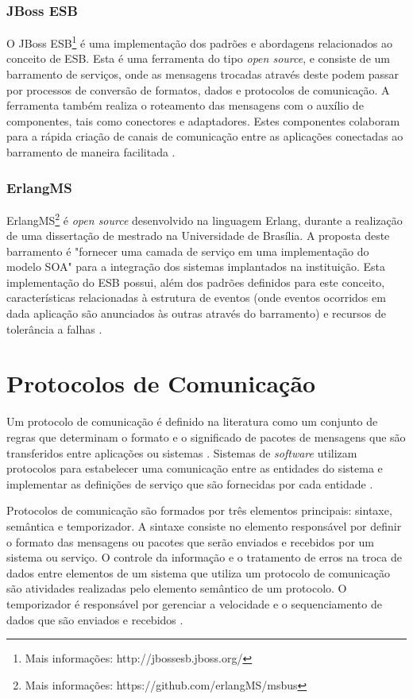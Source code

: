 \subsubsection{JBoss ESB}
O JBoss ESB\footnote{Mais informações: http://jbossesb.jboss.org/} é uma implementação dos padrões e abordagens relacionados ao conceito de ESB. Esta é uma ferramenta do tipo \textit{open source}, e consiste de um barramento de serviços, onde as mensagens trocadas através deste podem passar por processos de conversão de formatos, dados e protocolos de comunicação. A ferramenta também realiza o roteamento das mensagens com o auxílio de componentes, tais como conectores e adaptadores. Estes componentes colaboram para a rápida criação de canais de comunicação entre as aplicações conectadas ao barramento de maneira facilitada \cite{silva_jbossesb_2008}.

\subsubsection{ErlangMS}
ErlangMS\footnote{Mais informações: https://github.com/erlangMS/msbus} é \textit{open source} desenvolvido na linguagem Erlang, durante a realização de uma dissertação de mestrado na Universidade de Brasília. A proposta deste barramento é "fornecer uma camada de serviço em uma implementação do modelo SOA" para a integração dos sistemas implantados na instituição. Esta implementação do ESB possui, além dos padrões definidos para este conceito, características relacionadas à estrutura de eventos (onde eventos ocorridos em dada aplicação são anunciados às outras através do barramento) e recursos de tolerância a falhas \cite{agilar_uma_2015}.

\section{Protocolos de Comunicação}
Um protocolo de comunicação é definido na literatura como um conjunto de regras que determinam o formato e o significado de pacotes de mensagens que são transferidos entre aplicações ou sistemas \cite{Stallings_2006}. Sistemas de \textit{software} utilizam protocolos para estabelecer uma comunicação entre as entidades do sistema e implementar as definições de serviço que são fornecidas por cada entidade \cite{Stallings_2006}.

Protocolos de comunicação são formados por três elementos principais: sintaxe, semântica e temporizador. A sintaxe consiste no elemento responsável por definir o formato das mensagens ou pacotes que serão enviados e recebidos por um sistema ou serviço. O controle da informação e o tratamento de erros na troca de dados entre elementos de um sistema que utiliza um protocolo de comunicação são atividades realizadas pelo elemento semântico de um protocolo. O temporizador é responsável por gerenciar a velocidade e o sequenciamento de dados que são enviados e recebidos \cite{Stallings_2006}.

